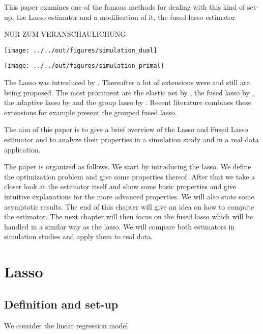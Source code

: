 \documentclass{article}
\theoremstyle{definition}
\begin{document}
This paper examines one of the famous methods for dealing with this kind of set-up, the Lasso estimator and a modification of it, the fused lasso estimator.

NUR ZUM  VERANSCHAULICHUNG 

\texttt{[image: ../../out/figures/simulation\_dual]}

\texttt{[image: ../../out/figures/simulation\_primal]}

The Lasso was introduced by \citet{lasso}. Thereafter a lot of extensions were and still are being proposed. The most prominent are the elastic net by \citet{zou2005regularization}, the fused lasso by \citet{fused}, the adaptive lasso by \citet{zou2006adaptive} and  the group lasso by \citet{meier2008group}. Recent literature combines these extensions for example  \citet{bleakley2011group} present the grouped fused lasso.

The aim of this paper is to give a brief overview of the Lasso and Fused Lasso estimator and to analyze their properties in a simulation study and in a real data application. 

The paper is organized as follows. We start by introducing the lasso. We define the optimization problem and give some properties thereof. After that we take a closer look at the estimator itself and show some basic properties and give intuitive explanations for the more advanced properties. We will also state some asymptotic results. The end of this chapter will give an idea on how to compute the estimator. The next chapter will then focus on the fused lasso which will be handled in a similar way as the lasso. We will compare both estimators in simulation studies and apply them to real data.




\newpage

\section{Lasso}
\subsection{Definition and set-up}
We consider the linear regression model
\end{document}
